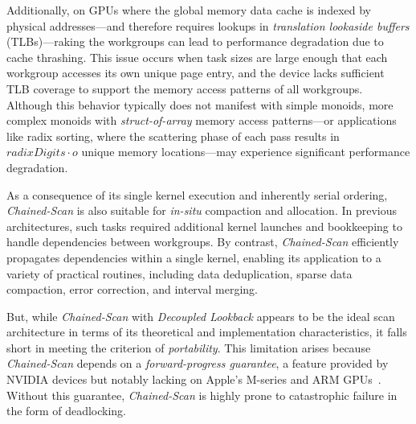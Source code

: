 \documentclass[sigconf]{acmart}
\begin{document}
Additionally, on GPUs where the global memory data cache is indexed by physical addresses—and therefore requires lookups in \emph{translation lookaside buffers} (TLBs)—raking the workgroups can lead to performance degradation due to cache thrashing. This issue occurs when task sizes are large enough that each workgroup accesses its own unique page entry, and the device lacks sufficient TLB coverage to support the memory access patterns of all workgroups. Although this behavior typically does not manifest with simple monoids, more complex monoids with \emph{struct-of-array} memory access patterns---or applications like radix sorting, where the scattering phase of each pass results in $radixDigits \cdot o$ unique memory locations---may experience significant performance degradation.

As a consequence of its single kernel execution and inherently serial ordering, \emph{Chained-Scan} is also suitable for \emph{in-situ} compaction and allocation. In previous architectures, such tasks required additional kernel launches and bookkeeping to handle dependencies between workgroups. By contrast, \emph{Chained-Scan} efficiently propagates dependencies within a single kernel, enabling its application to a variety of practical routines, including data deduplication, sparse data compaction, error correction, and interval merging.

But, while \emph{Chained-Scan} with \emph{Decoupled Lookback} appears to be the ideal scan architecture in terms of its theoretical and implementation characteristics, it falls short in meeting the criterion of \emph{portability}. This limitation arises because \emph{Chained-Scan} depends on a \emph{forward-progress guarantee}, a feature provided by NVIDIA devices but notably lacking on Apple's M-series and ARM GPUs~\cite{sorensen 2}. Without this guarantee, \emph{Chained-Scan} is highly prone to catastrophic failure in the form of deadlocking.
\end{document}
